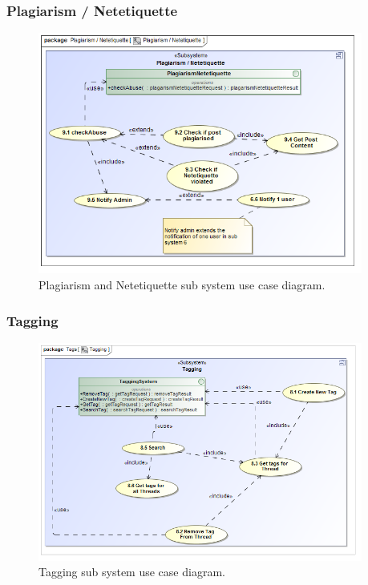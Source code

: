 \documentclass [a4paper,12pt] {article}
\begin{document}
		\subsubsection{Plagiarism / Netetiquette}
			\begin{figure}[H]
				\centering
				\includegraphics[width=0.95\textwidth]{PlagiarismNetetiquetteUC.png}
				\caption{Plagiarism and Netetiquette sub system use case diagram.}
			\end{figure}
		\subsubsection{Tagging}
			\begin{figure}[H]
				\centering
				\includegraphics[width=0.95\textwidth]{TaggingUC.png}
				\caption{Tagging sub system use case diagram.}
			\end{figure}
\end{document}
